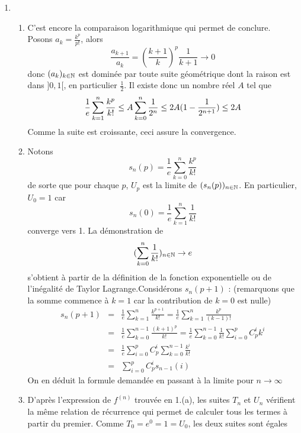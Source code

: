 \begin{enumerate}
\item \begin{enumerate}
     \item C'est encore la comparaison logarithmique qui permet de conclure. Posons $a_{k}=\frac{k^{p}}{p!}$, alors
$$\frac{a_{k+1}}{a_{k}}=\left(\frac{k+1}{k}\right)^{p}\frac{1}{k+1} \rightarrow 0$$
donc $(a_k)_{k\in \Bbb{N}}$ est dominée par toute suite géométrique dont la raison est dans $]0,1[$, en particulier $\frac{1}{2}$. Il existe donc un nombre réel $A$ tel que 
$$\frac{1}{e}\sum_{k=1}^{n}\frac{k^{p}}{k !} \leq A \sum_{k=0}^{n}\frac{1}{2^{n}}\\
\leq 2A(1-\frac{1}{2^{n+1}})\leq 2A$$
Comme la suite est croissante, ceci assure la convergence.
     \item Notons 
$$ s_{n}(p)= \frac{1}{e}\sum_{k=0}^{n}\frac{k^{p}}{k !}$$ de sorte que pour chaque $p$, $U_{p}$ est la limite de $(s_{n}(p))_{n\in \Bbb{N}}$. En particulier, $U_{0}=1$ car
\[s_{n}(0)=\frac{1}{e}\sum_{k=1}^{n}\frac{1}{k!}\]
converge vers 1. La démonstration de 
$$(\sum_{k=0}^{n}\frac{1}{k!})_{n\in \Bbb{N}}\rightarrow e$$
s'obtient à partir de la définition de la fonction exponentielle ou de l'inégalité de Taylor Lagrange.\newline Considérons $s_{n}(p+1)$ : (remarquons que la somme commence à $k=1$ car la contribution de $k=0$ est nulle)
\begin{eqnarray*}
s_{n}(p+1)&=&\frac{1}{e}\sum_{k=1}^{n}\frac{k^{p+1}}{k!}= \frac{1}{e}\sum_{k=1}^{n}\frac{k^{p}}{(k-1)!}\\
&=&\frac{1}{e}\sum_{k=0}^{n-1}\frac{(k+1)^{p}}{k!}
=\frac{1}{e}\sum_{k=0}^{n-1}\frac{1}{k!}\sum_{i=0}^{p}C_{p}^{i}k^{i}\\
&=&\frac{1}{e}\sum_{i=0}^{p} C_{p}^{i} \sum_{k=0}^{n-1}\frac{ k^{i}}{k!}\\
&=&\sum_{i=0}^{p} C_{p}^{i} s_{n-1}(i) 
\end{eqnarray*}
On en déduit la formule demandée en passant à la limite pour $n\rightarrow \infty$
%
\item D'après l'expression de $f^{(n)}$ trouvée en 1.(a), les suites $T_{n}$ et $U_{n}$ vérifient la même relation de récurrence qui permet de calculer tous les termes à partir du premier. Comme $T_{0}=e^{0}=1=U_{0}$, les deux suites sont égales \end{enumerate}

\end{enumerate}

